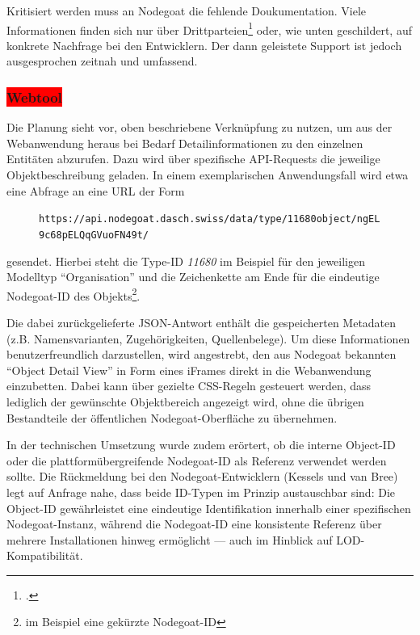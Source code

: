 \documentclass[12pt, a4paper, ngerman, bidi=default]{article}
\let\cite\footcite
\newcommand{\code}[1]{\colorbox{VeryLightGray}{\texttt{#1}}} %
\begin{document}
Kritisiert werden muss an Nodegoat die fehlende Doukumentation. Viele Informationen finden sich nur über Drittparteien\cite[beispielsweise durch Schulungsunterlagen von Universitäten, 
hier besonders:\\][]{gubler_nodegoat_nodate} oder, wie unten geschildert, auf konkrete Nachfrage bei den Entwicklern. Der dann geleistete Support 
ist jedoch ausgesprochen zeitnah und umfassend. 



\subsubsection{\colorbox{red}{Webtool}}\label{subsec:webtool_chapter}
Die Planung sieht vor, oben beschriebene Verknüpfung zu nutzen, um aus der Webanwendung heraus bei Bedarf Detailinformationen zu den einzelnen Entitäten abzurufen. 
Dazu wird über spezifische API-Requests die jeweilige Objektbeschreibung geladen. In einem exemplarischen Anwendungsfall wird etwa eine Abfrage an eine URL der Form
\begin{figure}
  \hspace*{-0.6cm}%
  \centering\code{https://api.nodegoat.dasch.swiss/data/type/\colorbox{MediumGray}{11680}object/ngEL9c68pELQqGVuoFN49t/}
\end{figure}
gesendet. Hierbei steht die Type-ID \textit{11680} im Beispiel für den jeweiligen Modelltyp \enquote{Organisation} und die Zeichenkette am Ende für die eindeutige Nodegoat-ID 
des Objekts\footnote{im Beispiel eine gekürzte Nodegoat-ID}.

Die dabei zurückgelieferte JSON-Antwort enthält die gespeicherten Metadaten (z.B. Namensvarianten, Zugehörigkeiten, Quellenbelege). Um diese Informationen benutzerfreundlich darzustellen, 
wird angestrebt, den aus Nodegoat bekannten \enquote{Object Detail View} in Form eines iFrames direkt in die Webanwendung einzubetten. Dabei kann über gezielte CSS-Regeln gesteuert werden, dass 
lediglich der gewünschte Objektbereich angezeigt wird, ohne die übrigen Bestandteile der öffentlichen Nodegoat-Oberfläche zu übernehmen.

In der technischen Umsetzung wurde zudem erörtert, ob die interne Object-ID oder die plattformübergreifende Nodegoat-ID als Referenz verwendet werden sollte. Die Rückmeldung bei den
Nodegoat-Entwicklern (Kessels und van Bree) legt auf Anfrage nahe, dass beide ID-Typen im Prinzip austauschbar sind: Die Object-ID gewährleistet eine eindeutige Identifikation 
innerhalb einer spezifischen Nodegoat-Instanz, 
während die Nodegoat-ID eine konsistente Referenz über mehrere Installationen hinweg ermöglicht — auch im Hinblick auf LOD-Kompatibilität.
\end{document}
